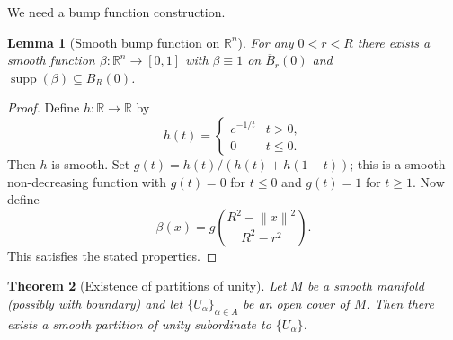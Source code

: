 \documentclass[12pt,a4paper,openany]{book}
\newtheorem{theorem}{Theorem}[section]
\newtheorem{lemma}[theorem]{Lemma}
\theoremstyle{definition}
\theoremstyle{remark}
\newcommand{\R}{\mathbb{R}}
\newcommand{\norm}[1]{\left\lVert #1 \right\rVert}
\begin{document}
We need a bump function construction.

\begin{lemma}[Smooth bump function on $\R^n$]\label{lem:bump}
For any $0 < r < R$ there exists a smooth function
$\beta \colon \R^n \to [0,1]$ with $\beta \equiv 1$ on
$\overline{B}_r(0)$ and $\operatorname{supp}(\beta) \subseteq B_R(0)$.
\end{lemma}

\begin{proof}
Define $h \colon \R \to \R$ by
\[
  h(t) =
  \begin{cases}
    e^{-1/t} & t > 0,\\
    0 & t \leq 0.
  \end{cases}
\]
Then $h$ is smooth.  Set $g(t) = h(t)/(h(t) + h(1-t))$; this is a smooth
non-decreasing function with $g(t) = 0$ for $t \leq 0$ and $g(t) = 1$ for
$t \geq 1$.  Now define
\[
  \beta(x) = g\!\left(\frac{R^2 - \norm{x}^2}{R^2 - r^2}\right).
\]
This satisfies the stated properties.
\end{proof}


\begin{center}
\label{fig:bump-function}
\end{center}

\begin{theorem}[Existence of partitions of unity]\label{thm:partition-unity}
Let $M$ be a smooth manifold (possibly with boundary) and let
$\{U_\alpha\}_{\alpha \in A}$ be an open cover of $M$.  Then there exists a
smooth partition of unity subordinate to $\{U_\alpha\}$.
\end{theorem}
\end{document}
